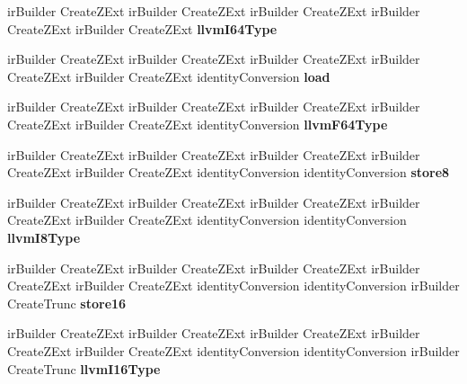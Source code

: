 \begin{DoxyCompactItemize}
ir\+Builder Create\+Z\+Ext ir\+Builder Create\+Z\+Ext ir\+Builder Create\+Z\+Ext ir\+Builder Create\+Z\+Ext ir\+Builder Create\+Z\+Ext {\bfseries llvm\+I64\+Type}
\item 
\mbox{\label{struct_l_l_v_m_j_i_t_1_1_emit_function_context_aaa9ae6f30d75f448f336223bde371cca}} 
ir\+Builder Create\+Z\+Ext ir\+Builder Create\+Z\+Ext ir\+Builder Create\+Z\+Ext ir\+Builder Create\+Z\+Ext ir\+Builder Create\+Z\+Ext identity\+Conversion {\bfseries load}
\item 
\mbox{\label{struct_l_l_v_m_j_i_t_1_1_emit_function_context_aee47596778842c7d2377c4374736c13f}} 
ir\+Builder Create\+Z\+Ext ir\+Builder Create\+Z\+Ext ir\+Builder Create\+Z\+Ext ir\+Builder Create\+Z\+Ext ir\+Builder Create\+Z\+Ext identity\+Conversion {\bfseries llvm\+F64\+Type}
\item 
\mbox{\label{struct_l_l_v_m_j_i_t_1_1_emit_function_context_a465eb4d03f17bb567673b5854f269c35}} 
ir\+Builder Create\+Z\+Ext ir\+Builder Create\+Z\+Ext ir\+Builder Create\+Z\+Ext ir\+Builder Create\+Z\+Ext ir\+Builder Create\+Z\+Ext identity\+Conversion identity\+Conversion {\bfseries store8}
\item 
\mbox{\label{struct_l_l_v_m_j_i_t_1_1_emit_function_context_ac5c73677e3c305374fe68ff1f82b18ef}} 
ir\+Builder Create\+Z\+Ext ir\+Builder Create\+Z\+Ext ir\+Builder Create\+Z\+Ext ir\+Builder Create\+Z\+Ext ir\+Builder Create\+Z\+Ext identity\+Conversion identity\+Conversion {\bfseries llvm\+I8\+Type}
\item 
\mbox{\label{struct_l_l_v_m_j_i_t_1_1_emit_function_context_a42e4a97f928031d02e8312e562184497}} 
ir\+Builder Create\+Z\+Ext ir\+Builder Create\+Z\+Ext ir\+Builder Create\+Z\+Ext ir\+Builder Create\+Z\+Ext ir\+Builder Create\+Z\+Ext identity\+Conversion identity\+Conversion ir\+Builder Create\+Trunc {\bfseries store16}
\item 
\mbox{\label{struct_l_l_v_m_j_i_t_1_1_emit_function_context_a8e0f8ce614e9af52e8de15016db68526}} 
ir\+Builder Create\+Z\+Ext ir\+Builder Create\+Z\+Ext ir\+Builder Create\+Z\+Ext ir\+Builder Create\+Z\+Ext ir\+Builder Create\+Z\+Ext identity\+Conversion identity\+Conversion ir\+Builder Create\+Trunc {\bfseries llvm\+I16\+Type}

\end{DoxyCompactItemize}
